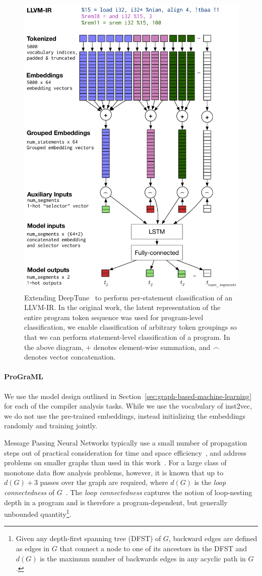 \begin{figure}
    \centering %
    \includegraphics[width=.62\columnwidth]{images/lstm_node_level}%
    \caption{%
      Extending DeepTune~\cite{Cummins2017b} to perform per-statement
      classification of an LLVM-IR. In the original work, the latent
      representation of the entire program token sequence was used for
      program-level classification, we enable classification of
      arbitrary token groupings so that we can perform statement-level
      classification of a program. In the above diagram, $+$ denotes
      element-wise summation, and $\frown$ denotes vector
      concatenation.%
    }%
    \label{figure:lstm_node_level}%
\end{figure}

\paragraph{ProGraML} We use the model design outlined in
Section~\ref{sec:graph-based-machine-learning} for each of the
compiler analysis tasks. While we use the vocabulary of inst2vec, we
do not use the pre-trained embeddings, instead initializing the
embeddings randomly and training jointly.

Message Passing Neural Networks typically use a small number of
propagation steps out of practical consideration for time and space
efficiency~\cite{Gilmer2017,Li2015a}, and address problems on smaller
graphs than used in this work~\cite{Allamanis2017b}. For a large class
of monotone data flow analysis problems, however, it is known that up
to $d(G) + 3$ passes over the graph are required, where $d(G)$ is the
\emph{loop connectedness} of $G$~\cite{Cooper2003,Kam1977}.  The
\emph{loop connectedness} captures the notion of loop-nesting depth in
a program and is therefore a program-dependent, but generally
unbounded quantity\footnote{Given any depth-first spanning tree (DFST)
  of $G$, backward edges are defined as edges in $G$ that connect a
  node to one of its ancestors in the DFST and $d(G)$ is the maximum
  number of backwards edges in any acyclic path in $G$.}.

